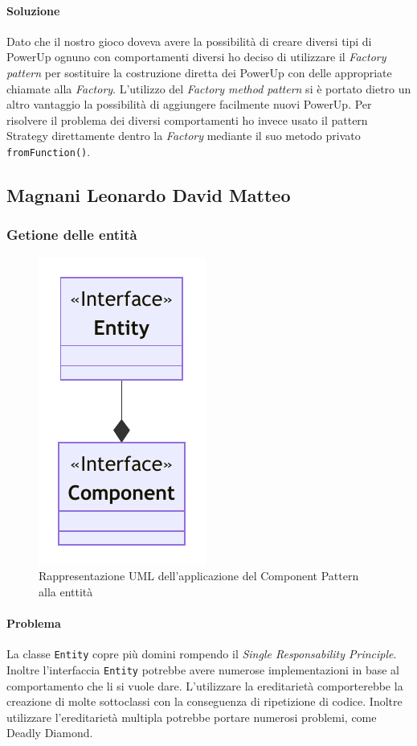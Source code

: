 \documentclass[a4paper,12pt]{report}
\begin{document}
\paragraph{Soluzione} Dato che il nostro gioco doveva avere la possibilità di creare diversi tipi di PowerUp ognuno con comportamenti diversi ho deciso di utilizzare il \textit{Factory pattern} per sostituire la costruzione diretta dei PowerUp con delle appropriate chiamate alla \textit{Factory}. L'utilizzo del \textit{Factory method pattern} si è portato dietro un altro vantaggio la possibilità di aggiungere facilmente nuovi PowerUp.
Per risolvere il problema dei diversi comportamenti ho invece usato il pattern Strategy direttamente dentro la \textit{Factory} mediante il suo metodo privato \texttt{fromFunction()}.

\subsection*{Magnani Leonardo David Matteo}

\subsubsection{Getione delle entità}

\begin{figure}[H]
\centering{}
\includegraphics[width=.3\textwidth]{img/EntityComponentUML}
\caption{Rappresentazione UML dell'applicazione del Component Pattern alla enttità}
\end{figure}

\paragraph{Problema} La classe \texttt{Entity} copre più domini rompendo il \textit{Single Responsability Principle}.
Inoltre l'interfaccia \texttt{Entity} potrebbe avere numerose implementazioni in base al comportamento che li si vuole dare.
L'utilizzare la ereditarietà comporterebbe la creazione di molte sottoclassi con la conseguenza di ripetizione di codice.
Inoltre utilizzare l'ereditarietà multipla potrebbe portare numerosi problemi, come Deadly Diamond.
\end{document}
